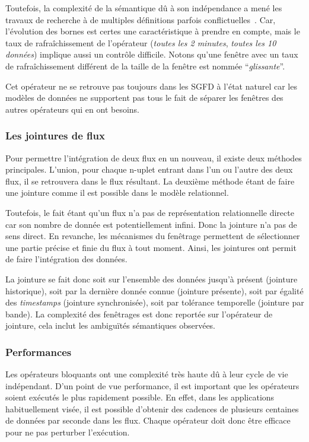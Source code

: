 Toutefois, la complexité de la sémantique dû à son indépendance a mené les travaux de recherche à de multiples définitions parfois conflictuelles~\cite{Jain:spread}. Car, l'évolution des bornes est certes une caractéristique à prendre en compte, mais le taux de rafraîchissement de l'opérateur (\textit{toutes les 2 minutes}, \textit{toutes les 10 données}) implique aussi un contrôle difficile. Notons qu'une fenêtre avec un taux de rafraîchissement différent de la taille de la fenêtre est nommée \enquote{\it glissante}.

Cet opérateur ne se retrouve pas toujours dans les SGFD à l'état naturel car les modèles de données ne supportent pas tous le fait de séparer les fenêtres des autres opérateurs qui en ont besoins.

\subsubsection{Les jointures de flux}
Pour permettre l'intégration de deux flux en un nouveau, il existe deux méthodes principales. L'union, pour chaque n-uplet entrant dans l'un ou l'autre des deux flux, il se retrouvera dans le flux résultant. La deuxième méthode étant de faire une jointure comme il est possible dans le modèle relationnel.

Toutefois, le fait étant qu'un flux n'a pas de représentation relationnelle directe car son nombre de donnée est potentiellement infini. Donc la jointure n'a pas de sens direct. En revanche, les mécanismes du fenêtrage permettent de sélectionner une partie précise et finie du flux à tout moment. Ainsi, les jointures ont permit de faire l'intégration des données.

La jointure se fait donc soit sur l'ensemble des données jusqu'à présent (jointure historique), soit par la dernière donnée connue (jointure présente), soit par égalité des \textit{timestamps} (jointure synchronisée), soit par tolérance temporelle (jointure par bande). La complexité des fenêtrages est donc reportée sur l'opérateur de jointure, cela inclut les ambiguïtés sémantiques observées.

\subsubsection{Performances}
Les opérateurs bloquants ont une complexité très haute dû à leur cycle de vie indépendant. D'un point de vue performance, il est important que les opérateurs soient exécutés le plus rapidement possible. En effet, dans les applications habituellement visée, il est possible d'obtenir des cadences de plusieurs centaines de données par seconde dans les flux. Chaque opérateur doit donc être efficace pour ne pas perturber l'exécution.

